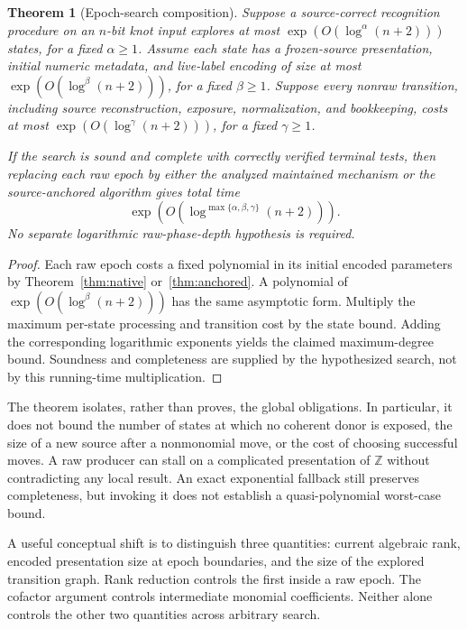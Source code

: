 \documentclass[11pt,letterpaper]{article}
\newtheorem{theorem}{Theorem}[section]
\theoremstyle{definition}
\theoremstyle{remark}\newtheorem{remark}[theorem]{Remark}
\newcommand{\Z}{\mathbb Z}\newcommand{\Q}{\mathbb Q}
\begin{document}
\begin{theorem}[Epoch-search composition]
\label{thm:qp}
Suppose a source-correct recognition procedure on an $n$-bit knot input
explores at most $\exp(O(\log^{\alpha}(n+2)))$ states, for a fixed
$\alpha\ge1$. Assume each state has a frozen-source presentation, initial
numeric metadata, and live-label encoding of size at most
$\exp(O(\log^{\beta}(n+2)))$, for a fixed $\beta\ge1$. Suppose every
nonraw transition, including source reconstruction, exposure, normalization,
and bookkeeping, costs at most
$\exp(O(\log^{\gamma}(n+2)))$, for a fixed $\gamma\ge1$.

If the search is sound and complete with correctly verified terminal tests,
then replacing each raw epoch by either the analyzed maintained mechanism or
the source-anchored algorithm gives total time
\[
 \exp\!\left(O\!\left(\log^{\max\{\alpha,\beta,\gamma\}}(n+2)\right)\right).
\]
No separate logarithmic raw-phase-depth hypothesis is required.
\end{theorem}
\begin{proof}
Each raw epoch costs a fixed polynomial in its initial encoded parameters by
Theorem~\ref{thm:native} or~\ref{thm:anchored}. A polynomial of
$\exp(O(\log^{\beta}(n+2)))$ has the same asymptotic form. Multiply the maximum
per-state processing and transition cost by the state bound. Adding the
corresponding logarithmic exponents yields the claimed maximum-degree bound.
Soundness and completeness are supplied by the hypothesized search, not by
this running-time multiplication.
\end{proof}

The theorem isolates, rather than proves, the global obligations. In
particular, it does not bound the number of states at which no coherent donor
is exposed, the size of a new source after a nonmonomial move, or the cost of
choosing successful moves. A raw producer can stall on a complicated
presentation of $\Z$ without contradicting any local result. An exact
exponential fallback still preserves completeness, but invoking it does not
establish a quasi-polynomial worst-case bound.

A useful conceptual shift is to distinguish three quantities: current
algebraic rank, encoded presentation size at epoch boundaries, and the size of
the explored transition graph. Rank reduction controls the first inside a
raw epoch. The cofactor argument controls intermediate monomial coefficients.
Neither alone controls the other two quantities across arbitrary search.
\end{document}
